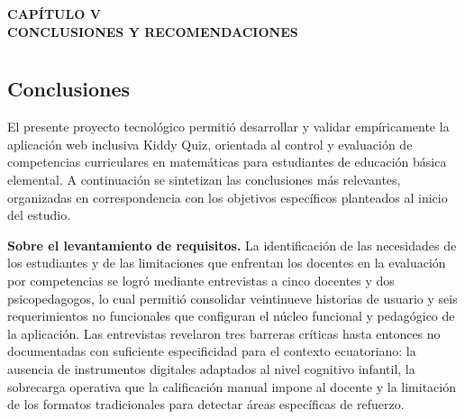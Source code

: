 
\cleardoublepage
\thispagestyle{empty}
\vspace*{\fill}
\begin{center}
{\Large\bfseries CAPÍTULO V}\\[2.5cm]
{\Large\bfseries CONCLUSIONES Y RECOMENDACIONES}
\end{center}
\vspace*{\fill}
\clearpage

\chapter*{}
\setcounter{chapter}{5}
\setcounter{section}{0}
\renewcommand{\thesection}{5.\arabic{section}}
\renewcommand{\thesubsection}{5.\arabic{section}.\arabic{subsection}}

\vspace{-3cm}

\section{Conclusiones}

El presente proyecto tecnológico permitió desarrollar y validar empíricamente la aplicación web inclusiva Kiddy Quiz, orientada al control y evaluación de competencias curriculares en matemáticas para estudiantes de educación básica elemental. A continuación se sintetizan las conclusiones más relevantes, organizadas en correspondencia con los objetivos específicos planteados al inicio del estudio.

\textbf{Sobre el levantamiento de requisitos.} La identificación de las necesidades de los estudiantes y de las limitaciones que enfrentan los docentes en la evaluación por competencias se logró mediante entrevistas a cinco docentes y dos psicopedagogos, lo cual permitió consolidar veintinueve historias de usuario y seis requerimientos no funcionales que configuran el núcleo funcional y pedagógico de la aplicación. Las entrevistas revelaron tres barreras críticas hasta entonces no documentadas con suficiente especificidad para el contexto ecuatoriano: la ausencia de instrumentos digitales adaptados al nivel cognitivo infantil, la sobrecarga operativa que la calificación manual impone al docente y la limitación de los formatos tradicionales para detectar áreas específicas de refuerzo.

